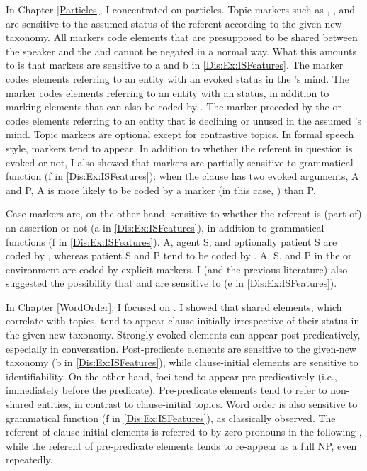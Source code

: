 In Chapter \ref{Particles},
I concentrated on particles.
Topic markers such as , , and 
are sensitive to the assumed status of the referent according to the given-new taxonomy. 
All  markers code elements that are presupposed to be
shared between the speaker and the 
and cannot be negated in a normal way.
What this amounts to is that  markers are sensitive to
a and b in \ref{Dis:Ex:ISFeatures}.
The marker  codes elements referring to an entity with an evoked status in the 's mind.
The marker  codes elements referring to an entity with an  status,
in addition to marking elements that can also be coded by .
The marker  preceded by the   or 
codes elements referring to an entity that is declining or unused in the assumed 's mind.
Topic markers are optional except for contrastive topics.
In formal speech style,
 markers tend to appear.
In addition to whether the referent in question is evoked or not,
I also showed that  markers are partially sensitive to grammatical function (f in \ref{Dis:Ex:ISFeatures}):
when the clause has two evoked arguments, A and P,
A is more likely to be coded by a  marker (in this case, ) than P.

Case markers are, on the other hand, sensitive to whether the referent is (part of) an assertion or not (a in \ref{Dis:Ex:ISFeatures}),
in addition to grammatical functions (f in \ref{Dis:Ex:ISFeatures}).
A, agent S, and optionally patient S are coded by ,
whereas patient S and P tend to be coded by \ci{\O}.
A, S, and P in the  or  environment are coded by explicit markers.
I (and the previous literature) also suggested the possibility that
 and  are sensitive to  (e in \ref{Dis:Ex:ISFeatures}).

In Chapter \ref{WordOrder},
I focused on .
I showed that shared elements, which correlate with topics, tend to appear clause-initially irrespective of their status in the given-new taxonomy.
Strongly evoked elements can appear post-predic\-a\-tively,
especially in conversation.
Post-predicate elements are sensitive to the given-new taxonomy (b in \ref{Dis:Ex:ISFeatures}),
while clause-initial elements are sensitive to identifiability.
On the other hand, foci tend to appear pre-predicatively
(i.e., immediately before the predicate).
Pre-predicate elements tend to refer to non-shared entities,
in contrast to clause-initial topics.
Word order is also sensitive to grammatical function (f in \ref{Dis:Ex:ISFeatures}),
as classically observed. The referent of clause-initial elements is referred to by zero pronouns in the following , while the referent of pre-predicate elements tends to re-appear as a full NP, even repeatedly. 

